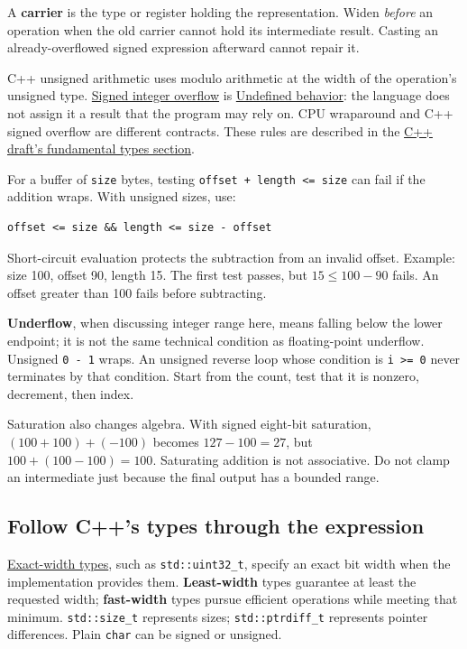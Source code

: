 A \textbf{carrier} is the type or register holding the representation. Widen \emph{before} an operation when the old carrier cannot hold its intermediate result. Casting an already-overflowed signed expression afterward cannot repair it.

C++ unsigned arithmetic uses modulo arithmetic at the width of the operation's unsigned type. \hyperref[appendix-1a599c924a4e]{Signed integer overflow} is \hyperref[appendix-f558f5b4d8f2]{Undefined behavior}: the language does not assign it a result that the program may rely on. CPU wraparound and C++ signed overflow are different contracts. These rules are described in the \href{https://eel.is/c++draft/basic.fundamental}{C++ draft's fundamental types section}.

For a buffer of \texttt{size} bytes, testing \texttt{offset\ +\ length\ \textless{}=\ size} can fail if the addition wraps. With unsigned sizes, use:

\begin{verbatim}
offset <= size && length <= size - offset
\end{verbatim}

Short-circuit evaluation protects the subtraction from an invalid offset. Example: size 100, offset 90, length 15. The first test passes, but \(15\le 100-90\) fails. An offset greater than 100 fails before subtracting.

\textbf{Underflow}, when discussing integer range here, means falling below the lower endpoint; it is not the same technical condition as floating-point underflow. Unsigned \texttt{0\ -\ 1} wraps. An unsigned reverse loop whose condition is \texttt{i\ \textgreater{}=\ 0} never terminates by that condition. Start from the count, test that it is nonzero, decrement, then index.

Saturation also changes algebra. With signed eight-bit saturation, \((100+100)+(-100)\) becomes \(127-100=27\), but \(100+(100-100)=100\). Saturating addition is not associative. Do not clamp an intermediate just because the final output has a bounded range.

\subsection{Follow C++'s types through the expression}\label{01-foundations-i-ch001-follow-cs-types-through-the-expression}

\hyperref[appendix-cc04044b5782]{Exact-width types}, such as \texttt{std::uint32\_t}, specify an exact bit width when the implementation provides them. \textbf{Least-width} types guarantee at least the requested width; \textbf{fast-width} types pursue efficient operations while meeting that minimum. \texttt{std::size\_t} represents sizes; \texttt{std::ptrdiff\_t} represents pointer differences. Plain \texttt{char} can be signed or unsigned.

